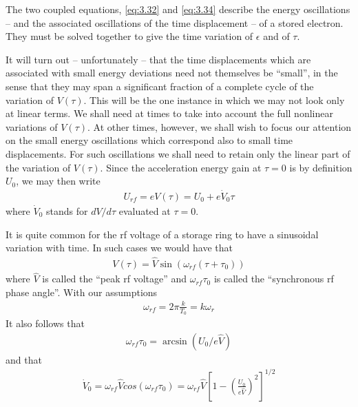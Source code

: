 The two coupled equations, \eqref{eq:3.32} and \eqref{eq:3.34} describe the energy oscillations -- and the associated oscillations of the time displacement -- of a stored electron. They must be solved together to give the time variation of $\epsilon$ and of $\tau$.

It will turn out -- unfortunately -- that the time displacements which are associated with small energy deviations need not themselves be ``small'', in the sense that they may span a significant fraction of a complete cycle of the variation of $V(\tau)$. This will be the one instance in which we may not look only at linear terms. We shall need at times to take into account the full nonlinear variations of $V(\tau)$. At other times, however, we shall wish to focus our attention on the small energy oscillations which correspond also to small time displacements. For such oscillations we shall need to retain only the linear part of the variation of $V(\tau)$. Since the acceleration energy gain at $\tau = 0$ is by definition $U_0$, we may then write
\begin{align}
	U_{rf} = eV(\tau) = U_0 + e\dot{V}_0\tau\label{eq:3.35}
\end{align}
where $\dot{V}_0$ stands for $dV/d\tau$ evaluated at $\tau=0$.

It is quite common for the rf voltage of a storage ring to have a sinusoidal variation with time. In such cases we would have that
\begin{align}\label{eq:3.36}
	V(\tau) = \widehat{V} \sin(\omega_{rf}(\tau+\tau_0))
\end{align}
where $\widehat{V}$ is called the ``peak rf voltage'' and $\omega_{rf}\tau_0$  is called the ``synchronous rf phase angle''. With our assumptions
\begin{align}
	\omega_{rf} = 2\pi \frac{k}{T_0} = k\omega_r
\end{align}
It also follows that
\begin{align}
	\omega_{rf}\tau_0 = \arcsin(U_0/e\widehat{V})
\end{align}
and that
\begin{align}
	\dot{V}_0 = \omega_{rf}\widehat{V}cos(\omega_{rf}\tau_0) = \omega_{rf}\widehat{V}\left[1-\left(\frac{U_0}{e\widehat{V}}\right)^2\right]^{1/2}
\end{align}
